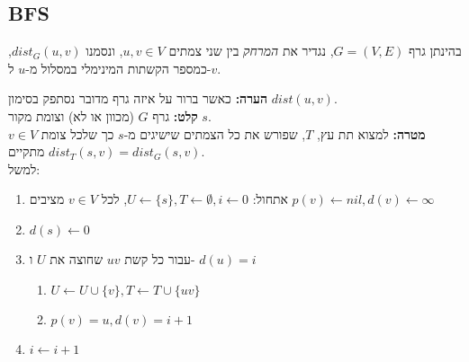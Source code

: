 \subsection*{BFS}
\begin{definition}[מרחק]
בהינתן גרף 
$G = (V, E)$,
נגדיר את 
\emph{המרחק}
בין שני צמתים 
$u,v \in V$,
ונסמנו 
$dist_G(u,v)$,
כמספר הקשתות המינימלי במסלול מ-$u$ ל-$v$.
\end{definition}
\noindent
\textbf{הערה:}
כאשר ברור על איזה גרף מדובר נסתפק בסימון 
$dist(u,v)$.
\vspace{5mm}
\\
\textbf{קלט:}
גרף $G$ (מכוון או לא) וצומת מקור $s$.
\\
\textbf{מטרה:}
למצוא תת עץ, $T$, שפורש את כל הצמתים שישיגים מ-$s$ כך שלכל צומת 
$v \in V$
מתקיים
$dist_T(s, v) = dist_G(s, v)$.
\\
למשל:
\begin{center}
\end{center}

\begin{enumerate}
\item
אתחול:
$U \leftarrow \{s\}, T \leftarrow \emptyset, i \leftarrow 0$, 
לכל 
$v \in V$
מציבים
$p(v) \leftarrow nil, d(v) \leftarrow \infty$
\item
$d(s) \leftarrow 0$
\item
עבור כל קשת 
$uv$
שחוצה את $U$ ו-%
$d(u) = i$
	\begin{enumerate}
	\item
	$U \leftarrow U \cup \{v\}, T \leftarrow T \cup \{uv\}$
	\item
	$p(v) = u, d(v) = i + 1$
	\end{enumerate}
\item
$i \leftarrow i+1$
\end{enumerate}

